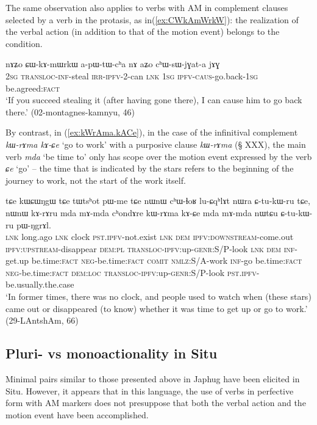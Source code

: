 \documentclass[oneside,a4paper,11pt]{article}
\newcommand{\forme}[1]{\textit{\phon#1}}
\newcommand{\japhug}[2]{\textit{\phon#1} `#2'}
\begin{document}
The same observation also applies to  verbs with AM in complement clauses selected by a verb in the protasis, as in(\ref{ex:CWkAmWrkW}): the realization of the verbal action (in addition to that of the motion event) belongs to the condition.

\begin{exe}
\ex \label{ex:CWkAmWrkW}
\gll nɤʑo ɕɯ-kɤ-mɯrkɯ a-pɯ-tɯ-cʰa nɤ aʑo cʰɯ-sɯ-jɣat-a jɤɣ \\
\textsc{2sg} \textsc{transloc}-\textsc{inf}-steal \textsc{irr}-\textsc{ipfv}-2-can \textsc{lnk} \textsc{1sg} \textsc{ipfv}-\textsc{caus}-go.back-\textsc{1sg} be.agreed:\textsc{fact} \\
\glt `If you succeed stealing it (after having gone there), I can cause him to go back there.' (02-montagnes-kamnyu, 46)
\end{exe}

By contrast, in  (\ref{ex:kWrAma.kACe}), in the case of the infinitival complement \forme{kɯ-rɤma kɤ-ɕe} `go to work' with a purposive clause \forme{kɯ-rɤma} (§ XXX), the main verb \japhug{mda}{be time to} only has scope over the motion event expressed by the verb \japhug{ɕe}{go} -- the time that is indicated by the stars refers to the beginning of the journey to work, not the start of the work itself.
 
 \begin{exe}
\ex \label{ex:kWrAma.kACe}
\gll  tɕe kɯɕɯŋgɯ tɕe tɯtsʰot pɯ-me tɕe  nɯnɯ cʰɯ-ɬoʁ lu-ɕqʰlɤt nɯra ɕ-tu-kɯ-ru tɕe, nɯnɯ kɤ-rɤru mda mɤ-mda cʰondɤre kɯ-rɤma kɤ-ɕe mda mɤ-mda nɯtɕu ɕ-tu-kɯ-ru pɯ-ŋgrɤl. \\
 \textsc{lnk} long.ago \textsc{lnk} clock \textsc{pst}.\textsc{ipfv}-not.exist \textsc{lnk} \textsc{dem} \textsc{ipfv}:\textsc{downstream}-come.out \textsc{ipfv}:\textsc{upstream}-disappear \textsc{dem}:\textsc{pl} \textsc{transloc}-\textsc{ipfv}:up-\textsc{genr}:S/P-look \textsc{lnk} \textsc{dem} \textsc{inf}-get.up be.time:\textsc{fact} \textsc{neg}-be.time:\textsc{fact} \textsc{comit} \textsc{nmlz}:S/A-work \textsc{inf}-go be.time:\textsc{fact} \textsc{neg}-be.time:\textsc{fact} \textsc{dem}:\textsc{loc} \textsc{transloc}-\textsc{ipfv}:up-\textsc{genr}:S/P-look \textsc{pst}.\textsc{ipfv}-be.usually.the.case  \\
 \glt  `In former times, there was no clock, and people used to watch when (these stars) came out or disappeared (to know) whether it was time to get up or go to work.' (29-LAntshAm, 66)
  \end{exe}
  
\subsection{Pluri- vs monoactionality in Situ} \label{sec:am.situ}
Minimal pairs similar to those presented above in Japhug have been elicited in Situ. However, it appears that in this language, the use of verbs in perfective form with AM markers does not presuppose that both the verbal action and the motion event have been accomplished. 
\end{document}
